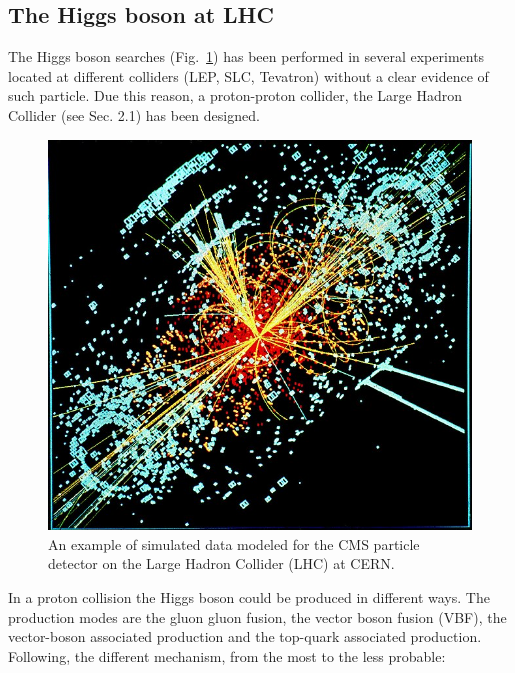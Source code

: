 \subsection*{The Higgs boson at LHC}
The Higgs boson  searches (Fig.~\ref{650px-CMS_Higgs-event}) has been performed in several experiments located  at different  colliders (LEP, SLC, Tevatron) without a clear evidence of such particle.
Due  this reason, a proton-proton collider, the Large Hadron Collider (see Sec. 2.1) has been designed. 
\begin{figure}
\centering
\includegraphics[scale= 0.3]{../Cap1/650px-CMS_Higgs-event}
\caption{An example of simulated data modeled for the CMS particle detector on the Large Hadron Collider (LHC) at CERN.}
\label{650px-CMS_Higgs-event}
\end{figure}  
In a proton collision the Higgs boson could be produced in different ways. The production modes are the gluon gluon fusion, the vector boson fusion (VBF), the vector-boson associated production and the top-quark associated production. Following, the different mechanism, from the most to the less probable:


